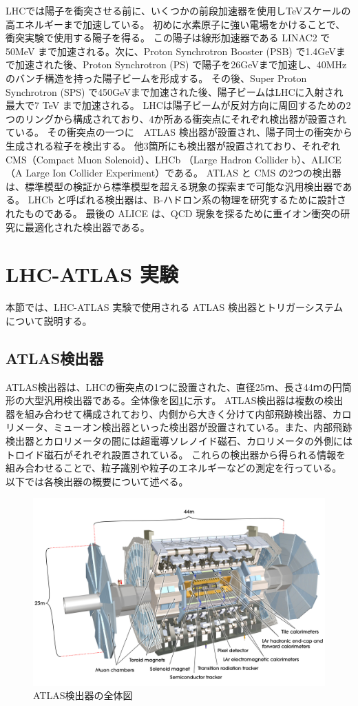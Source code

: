 LHCでは陽子を衝突させる前に、いくつかの前段加速器を使用しTeVスケールの高エネルギーまで加速している。
初めに水素原子に強い電場をかけることで、衝突実験で使用する陽子を得る。
この陽子は線形加速器である LINAC2 で 50MeV まで加速される。次に、Proton Synchrotron Booster (PSB) で1.4GeVまで加速された後、Proton Synchrotron (PS) で陽子を26GeVまで加速し、40MHzのバンチ構造を持った陽子ビームを形成する。
その後、Super Proton Synchrotron (SPS) で450GeVまで加速された後、陽子ビームはLHCに入射され最大で7 TeV まで加速される。
LHCは陽子ビームが反対方向に周回するための2つのリングから構成されており、4か所ある衝突点にそれぞれ検出器が設置されている。
その衝突点の一つに　ATLAS 検出器が設置され、陽子同士の衝突から生成される粒子を検出する。
他3箇所にも検出器が設置されており、それぞれCMS（Compact Muon Solenoid）、LHCb （Large Hadron Collider b）、ALICE （A Large Ion Collider Experiment）である。
ATLAS と CMS の2つの検出器は、標準模型の検証から標準模型を超える現象の探索まで可能な汎用検出器である。
LHCb と呼ばれる検出器は、B-ハドロン系の物理を研究するために設計されたものである。
最後の ALICE は、QCD 現象を探るために重イオン衝突の研究に最適化された検出器である。

\section{LHC-ATLAS 実験}
\label{section2-2}
本節では、LHC-ATLAS 実験で使用される ATLAS 検出器とトリガーシステムについて説明する。

\subsection{ATLAS検出器}
ATLAS検出器は、LHCの衝突点の1つに設置された、直径25ｍ、長さ44ｍの円筒形の大型汎用検出器である。全体像を図\ref{fig:ATLAS検出器}に示す。
ATLAS検出器は複数の検出器を組み合わせて構成されており、内側から大きく分けて内部飛跡検出器、カロリメータ、ミューオン検出器といった検出器が設置されている。また、内部飛跡検出器とカロリメータの間には超電導ソレノイド磁石、カロリメータの外側にはトロイド磁石がそれぞれ設置されている。
これらの検出器から得られる情報を組み合わせることで、粒子識別や粒子のエネルギーなどの測定を行っている。
以下では各検出器の概要について述べる。

\begin{figure}[tb]
  \centering
  \includegraphics[clip,width=14cm]{fig/2/0803012_01.jpg}
  \caption{ATLAS検出器の全体図}
  \label{fig:ATLAS検出器}
\end{figure}


